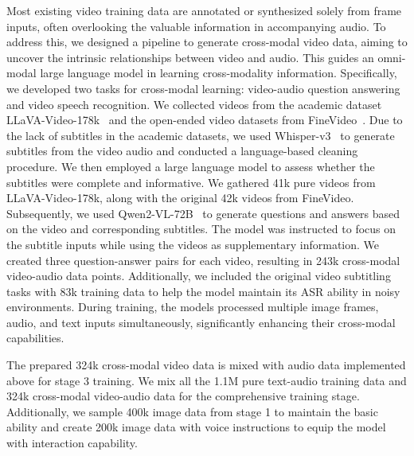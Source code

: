 Most existing video training data are annotated or synthesized solely from frame inputs, often overlooking the valuable information in accompanying audio. To address this, we designed a pipeline to generate cross-modal video data, aiming to uncover the intrinsic relationships between video and audio. This guides an omni-modal large language model in learning cross-modality information. Specifically, we developed two tasks for cross-modal learning: video-audio question answering and video speech recognition. We collected videos from the academic dataset LLaVA-Video-178k~\citep{zhang2024videoinstructiontuningsynthetic} and the open-ended video datasets from FineVideo~\citep{Farré2024FineVideo}. Due to the lack of subtitles in the academic datasets, we used Whisper-v3~\citep{radford2022whisper} to generate subtitles from the video audio and conducted a language-based cleaning procedure. We then employed a large language model to assess whether the subtitles were complete and informative. We gathered 41k pure videos from LLaVA-Video-178k, along with the original 42k videos from FineVideo. Subsequently, we used Qwen2-VL-72B~\citep{qwen2vl} to generate questions and answers based on the video and corresponding subtitles. The model was instructed to focus on the subtitle inputs while using the videos as supplementary information. We created three question-answer pairs for each video, resulting in 243k cross-modal video-audio data points. Additionally, we included the original video subtitling tasks with 83k training data to help the model maintain its ASR ability in noisy environments. During training, the models processed multiple image frames, audio, and text inputs simultaneously, significantly enhancing their cross-modal capabilities.

The prepared 324k cross-modal video data is mixed with audio data implemented above for stage 3 training. We mix all the 1.1M pure text-audio training data and 324k cross-modal video-audio data for the comprehensive training stage. Additionally, we sample 400k image data from stage 1 to maintain the basic ability and create 200k image data with voice instructions to equip the model with interaction capability. 